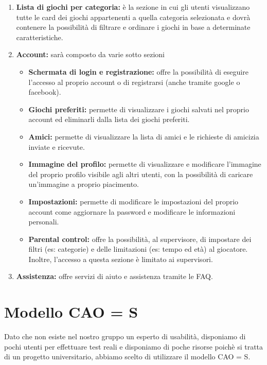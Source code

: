 \documentclass[../Report.tex]{subfiles}
\begin{document}
\begin{enumerate}
        \item \textbf{Lista di giochi per categoria:} è la sezione in cui gli utenti visualizzano tutte le card dei giochi appartenenti a quella categoria selezionata e dovrà contenere la possibilità di filtrare e ordinare i giochi in base a determinate caratteristiche.
        \item \textbf{Account:} sarà composto da varie sotto sezioni
        \begin{itemize}
            \item \textbf{Schermata di login e registrazione:} offre la possibilità di eseguire l'accesso al proprio account o di registrarsi (anche tramite google o facebook).
            \item \textbf{Giochi preferiti:} permette di visualizzare i giochi salvati nel proprio account ed eliminarli dalla lista dei giochi preferiti.
            \item \textbf{Amici:} permette di visualizzare la lista di amici e le richieste di amicizia inviate e ricevute.
            \item \textbf{Immagine del profilo:} permette di visualizzare e modificare l'immagine del proprio profilo visibile agli altri utenti, con la possibilità di caricare un'immagine a proprio piacimento.
            \item \textbf{Impostazioni:} permette di modificare le impostazioni del proprio account come aggiornare la password e modificare le informazioni personali.
            \item \textbf{Parental control:} offre la possibilità, al supervisore, di impostare dei filtri (es: categorie) e delle limitazioni (es: tempo ed età) al giocatore. Inoltre, l'accesso a questa sezione è limitato ai supervisori.
        \end{itemize}
        \item \textbf{Assistenza:} offre servizi di aiuto e assistenza tramite le FAQ.
    \end{enumerate}
    \section{Modello CAO = S}
    \label{section:CAOS}
    Dato che non esiste nel nostro gruppo un esperto di usabilità, disponiamo di pochi utenti per effettuare test reali e disponiamo di poche risorse poichè si tratta di un progetto universitario, abbiamo scelto di utilizzare il modello CAO = S.
\end{document}
